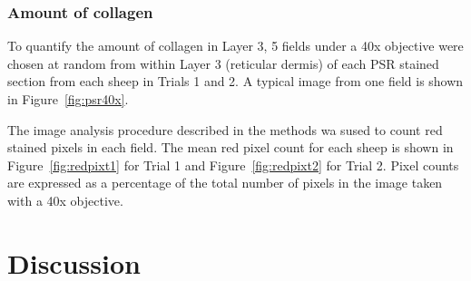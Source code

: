 \documentclass[titlepage]{article}  %
\begin{document}
\subsubsection{Amount of collagen}
To quantify the amount of collagen in Layer 3, 5 fields under a 40x objective were chosen at random from within Layer 3 (reticular dermis) of each PSR stained section from each sheep in Trials 1 and 2. A typical image from one field is shown in Figure~\ref{fig:psr40x}.
%

 The image analysis procedure described in the methods wa sused to count red stained pixels in each field. The mean red pixel count for each sheep is shown  in Figure~\ref{fig:redpixt1} for Trial 1 and Figure~\ref{fig:redpixt2} for Trial 2.
%
%
Pixel counts are expressed as a percentage of the total number of pixels in the image taken with a 40x objective.




\clearpage
\section{Discussion}
\end{document}
